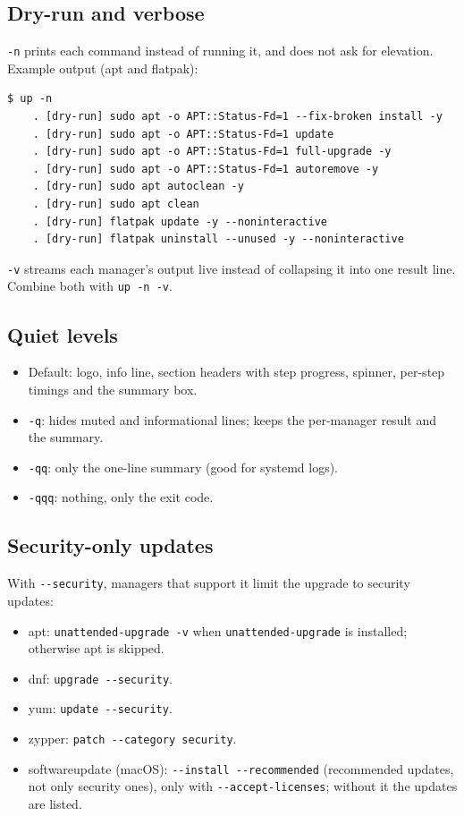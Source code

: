 \documentclass[11pt,a4paper]{article}
\begin{document}
\subsection{Dry-run and verbose}
\texttt{-n} prints each command instead of running it, and does not ask
for elevation. Example output (apt and flatpak):

\begin{lstlisting}[basicstyle=\ttfamily\footnotesize]
$ up -n
    . [dry-run] sudo apt -o APT::Status-Fd=1 --fix-broken install -y
    . [dry-run] sudo apt -o APT::Status-Fd=1 update
    . [dry-run] sudo apt -o APT::Status-Fd=1 full-upgrade -y
    . [dry-run] sudo apt -o APT::Status-Fd=1 autoremove -y
    . [dry-run] sudo apt autoclean -y
    . [dry-run] sudo apt clean
    . [dry-run] flatpak update -y --noninteractive
    . [dry-run] flatpak uninstall --unused -y --noninteractive
\end{lstlisting}

\texttt{-v} streams each manager's output live instead of collapsing it
into one result line. Combine both with \texttt{up -n -v}.

\subsection{Quiet levels}
\begin{itemize}
  \item Default: logo, info line, section headers with step progress,
        spinner, per-step timings and the summary box.
  \item \texttt{-q}: hides muted and informational lines; keeps the
        per-manager result and the summary.
  \item \texttt{-qq}: only the one-line summary (good for systemd
        logs).
  \item \texttt{-qqq}: nothing, only the exit code.
\end{itemize}

\subsection{Security-only updates}
With \texttt{-{}-security}, managers that support it limit the upgrade to
security updates:

\begin{itemize}
  \item apt: \texttt{unattended-upgrade -v} when \texttt{unattended-upgrade}
        is installed; otherwise apt is skipped.
  \item dnf: \texttt{upgrade -{}-security}.
  \item yum: \texttt{update -{}-security}.
  \item zypper: \texttt{patch -{}-category security}.
  \item softwareupdate (macOS): \texttt{-{}-install -{}-recommended}
        (recommended updates, not only security ones), only with
        \texttt{-{}-accept-licenses}; without it the updates are listed.
\end{itemize}
\end{document}
